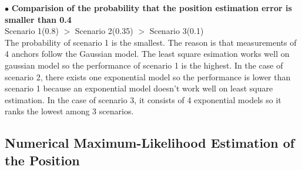 \documentclass[a4paper]{article}
\begin{document}
$\bullet$ \textbf{Comparision of the probability that the position estimation error is smaller than 0.4}\\

\hspace{0.5cm} Scenario 1(0.8) $>$ Scenario 2(0.35) $>$ Scenario 3(0.1)\\

\hspace{0.5cm} The probability of scenario 1 is the smallest. The reason is that measurements of 4 anchors follow the Gaussian model. The least square esimation works well on gaussian model so the performance of scenario 1 is the highest. In the case of scenario 2, there exists one exponential model so the performance is lower than scenario 1 because an exponential model doesn't work well on least square estimation. In the case of scenario 3, it consists of 4 exponential models so it ranks the lowest among 3 scenarios.


\clearpage
\subsection{Numerical Maximum-Likelihood Estimation of the Position}
\end{document}
